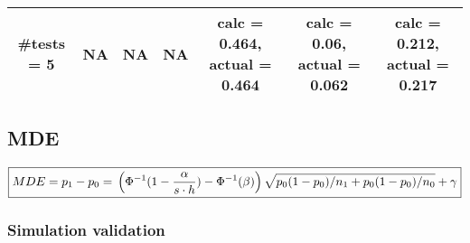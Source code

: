 \documentclass[
]{article}
\begin{document}
\begin{longtable}[]{@{}ccccccc@{}}
\begin{minipage}[t]{0.09\columnwidth}\centering
\textbf{\#tests = 5}\strut
\end{minipage} & \begin{minipage}[t]{0.08\columnwidth}\centering
NA\strut
\end{minipage} & \begin{minipage}[t]{0.08\columnwidth}\centering
NA\strut
\end{minipage} & \begin{minipage}[t]{0.08\columnwidth}\centering
NA\strut
\end{minipage} & \begin{minipage}[t]{0.16\columnwidth}\centering
calc = 0.464, actual = 0.464\strut
\end{minipage} & \begin{minipage}[t]{0.16\columnwidth}\centering
calc = 0.06, actual = 0.062\strut
\end{minipage} & \begin{minipage}[t]{0.16\columnwidth}\centering
calc = 0.212, actual = 0.217\strut
\end{minipage}\tabularnewline
\bottomrule
\end{longtable}

\hypertarget{mde}{%
\subsection{MDE}\label{mde}}

\[\boxed{MDE = p_1-p_0 = \\ \left(\Phi^{-1}(1 - \frac{\alpha}{s\cdot h}) - \Phi^{-1}(\beta)\right)\sqrt{p_0(1-p_0)/n_1 + p_0(1-p_0)/n_0} + \gamma}\]

\hypertarget{simulation-validation-2}{%
\subsubsection{Simulation validation}\label{simulation-validation-2}}
\end{document}
